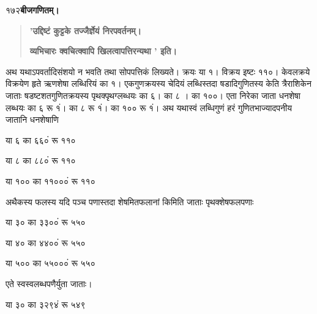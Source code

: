 \documentclass[11pt, openany]{book}
\begin{document}
\onehalfspacing
१७२\hspace{2in}\textbf{बीजगणितम्।} 

\vspace{5mm}

\begin{sloppypar}
\begin{quote}
\hspace{1in}\textbf{'उद्दिष्टं कुट्टके तज्जैर्ज्ञेयं निरपवर्तनम्।}

\hspace{1in}\textbf{व्यभिचारः क्वचित्क्वापि खिलत्वापत्तिरन्यथा ' इति।}
\end{quote}

\hangindent=0.2in \hspace{0.2in}अथ यथाऽपवर्तादिसंशयो न भवति तथा सोपपत्तिकं लिख्यते। क्रयः या १। विक्रय इष्टः ११०। केवलक्रये विक्रयेण हृते ऋणशेषा लब्धिरियं का १। एकगुणक्रयस्य चेदियं लब्धिस्तदा षडादिगुणितस्य केति त्रैराशिकेन जाताः षडष्टशतगुणितक्रयस्य पृथक्पृथग्लब्धयः का ६। का ८ । का १००। एता निरेका जाता धनशेषा लब्धयः का ६ रू १ं। का ८ रू १ं। का १०० रू १ं। अथ यथास्वं लब्धिगुणं हरं गुणितभाज्यादपनीय जातानि धनशेषाणि

\begin{center}
या\hspace{0.2in} ६ का\hspace{0.15in} ६६०ं रू ११०

या\hspace{0.2in} ८ का\hspace{0.15in} ८८०ं रू ११०

या १०० का ११०००ं रू ११०
\end{center}

\hangindent=0.2in अथैकस्य फलस्य यदि पञ्च पणास्तदा शेषमितफलानां किमिति जाताः पृथक्शेषफलपणाः

\begin{center}
या\hspace{0.1in} ३० का \hspace{0.1in} ३३००ं रू ५५०

या\hspace{0.1in} ४० का\hspace{0.1in} ४४००ं रू ५५०

या ५०० का ५५०००ं रू ५५०
\end{center}

\hangindent=0.2in \hspace{0.2in}एते स्वस्वलब्धपणैर्युता जाताः।

\begin{center}
या\hspace{0.1in} ३० का\hspace{0.1in} ३२९४ं रू ५४९


\end{center}
\end{sloppypar}
\end{document}
